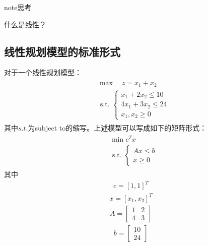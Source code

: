 \documentclass[letterpaper,10pt,english]{sphinxmanual}
\begin{document}
\begin{sphinxadmonition}{note}{思考}

什么是线性？
\end{sphinxadmonition}


\subsection{线性规划模型的标准形式}
\label{\detokenize{docs/LP:id5}}
对于一个线性规划模型：
\begin{equation*}
\begin{split}
\begin{aligned}
&\max \quad z= x_{1}+ x_{2}\\
&\text { s.t. }\left\{\begin{array}{l}
{x_{1}+2 x_{2} \leq 10} \\
{4 x_{1}+3 x_{2} \leq 24} \\
{ x_{1}, x_{2} \geq 0}
\end{array}\right.
\end{aligned}
\end{split}
\end{equation*}
其中\(s.t.\)为subject to的缩写。上述模型可以写成如下的矩阵形式：
\begin{equation*}
\begin{split}
\begin{aligned}
&\min c^{T} x\\
&\text { s.t. }\left\{\begin{array}{l}
{A x \leq b} \\
{ x \geq 0}
\end{array}\right.
\end{aligned}
\end{split}
\end{equation*}
其中
\begin{equation*}
\begin{split}
c = [1,1]^T
\end{split}
\end{equation*}\begin{equation*}
\begin{split}
x= [x_1,x_2]^T
\end{split}
\end{equation*}\begin{equation*}
\begin{split}
A = \left[ \begin{matrix}
1 & 2\\
4&3
\end{matrix}\right]
\end{split}
\end{equation*}\begin{equation*}
\begin{split}
b = \left[\begin{matrix}10\\24 \end{matrix}   \right]
\end{split}
\end{equation*}
\end{document}
